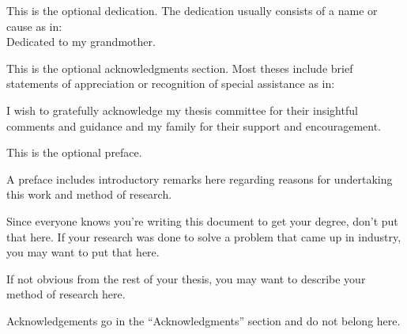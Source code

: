 %
%
%
%
%

\begin{dedication}
  This is the optional dedication.
  The dedication usually consists of a name or cause as in:\\
  Dedicated to my grandmother.
\end{dedication}

\begin{acknowledgments}
  This is the optional acknowledgments section.
  Most theses include brief statements of appreciation or recognition of special assistance as in:

  I wish to gratefully acknowledge my thesis committee for their insightful comments and guidance and my family for their support and encouragement.
\end{acknowledgments}

\begin{preface}
  This is the optional preface.

  A preface includes introductory remarks here regarding reasons for undertaking this work and method of research.

  Since everyone knows you're writing this document to get your degree, don't put that here.
  If your research was done to solve a problem that came up in industry, you may want to put that here.

  If not obvious from the rest of your thesis, you may want to describe your method of research here.

  Acknowledgements go in the ``Acknowledgments'' section and do not belong here.
\end{preface}

